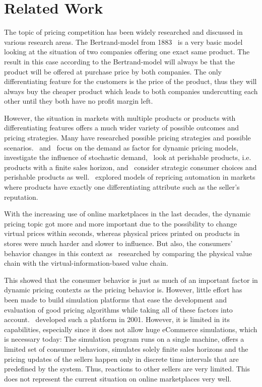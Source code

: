 %
\section{Related Work}
\label{sec:Related_Work}
%
The topic of pricing competition has been widely researched and discussed in various research areas. The Bertrand-model from 1883~\citep{bertrand1883} is a very basic model looking at the situation of two companies offering one exact same product. The result in this case according to the Bertrand-model will always be that the product will be offered at purchase price by both companies. The only differentiating feature for the customers is the price of the product, thus they will always buy the cheaper product which leads to both companies undercutting each other until they both have no profit margin left. 

However, the situation in markets with multiple products or products with differentiating features offers a much wider variety of possible outcomes and pricing strategies. Many have researched possible pricing strategies and possible scenarios.~\citet{kopalle1996} and~\citet{chintagunta1996} focus on the demand as factor for dynamic pricing models,~\citet{martinez2011} investigate the influence of stochastic demand,~\citet{gallego2008} look at perishable products, i.e. products with a finite sales horizon, and~\citet{levin2009} consider strategic consumer choices and perishable products as well.~\citet{popescu2015} explored models of repricing automation in markets where products have exactly one differentiating attribute such as the seller's reputation. 

With the increasing use of online marketplaces in the last decades, the dynamic pricing topic got more and more important due to the possibility to change virtual prices within seconds, whereas physical prices printed on products in stores were much harder and slower to influence. But also, the consumers' behavior changes in this context as~\citet{kannan2001} researched by comparing the physical value chain with the virtual-information-based value chain. 

This showed that the consumer behavior is just as much of an important factor in dynamic pricing contexts as the pricing behavior is. However, little effort has been made to build simulation platforms that ease the development and evaluation of good pricing algorithms while taking all of these factors into account.~\citet{morris2001} developed such a platform in 2001. However, it is limited in its capabilities, especially since it does not allow huge eCommerce simulations, which is necessary today: The simulation program runs on a single machine, offers a limited set of consumer behaviors, simulates solely finite sales horizons and the pricing updates of the sellers happen only in discrete time intervals that are predefined by the system. Thus, reactions to other sellers are very limited. This does not represent the current situation on online marketplaces very well.



